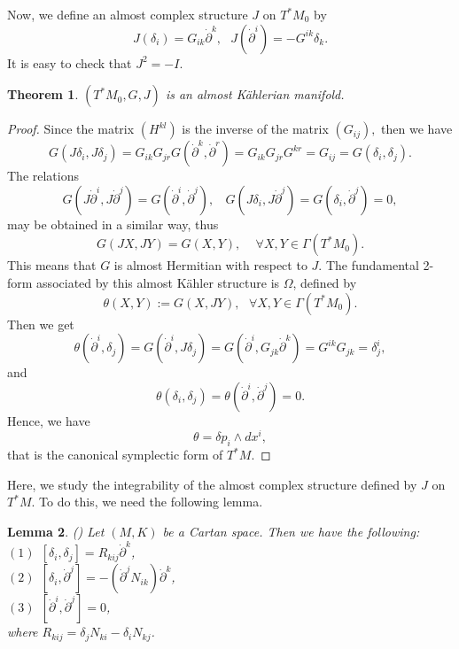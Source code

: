 \documentclass[10pt,a4paper]{article}
\theoremstyle{plain}
\newtheorem{theorem}{Theorem}[section]
\newtheorem{lemma}[theorem]{Lemma}
\theoremstyle{definition}
\begin{document}
Now, we define an almost complex structure  $J$  on  $T^{\ast}M_0$
by
\begin{equation}
J(\delta _{i})=G_{ik}\dot{\partial}^k,\ \ \
J(\dot{\partial}^i)=-G^{ik}\delta _k.
\end{equation}
It is easy to check that $J^2=-I$.
\begin{theorem}
 $(T^{\ast}M_0,G,J)$ is an almost K\"{a}hlerian manifold.
\end{theorem}
\begin{proof} Since the matrix $(H^{kl} )$ is the inverse of the
matrix $(G_{ij} ),$ then we have
\[
G(J\delta_i,J\delta_j)=G_{ik}G_{jr}G(\dot{\partial}^k,\dot{\partial}^r)=G_{ik}G_{jr}G^{kr}=G_{ij}=G(\delta_i,\delta_j).
\]
The relations
\[
G(J\dot{\partial}^i,J\dot{\partial}^j)=G(\dot{\partial}^i,\dot{\partial}^j),\
\ \ \ G(J\delta _i,J\dot{\partial}^j)=G(\delta
_i,\dot{\partial}^j)=0,
\]
may be obtained in a similar way, thus
\[
G(JX,JY)=G(X,Y),\, \, \, \, \, \, \, \forall X,Y\in
\Gamma(T^{\ast}M_0).
\]
This means that $G$ is almost Hermitian with respect to $J$. The
fundamental 2-form associated by this almost K\"{a}hler structure is
$\Omega$, defined by
\[
\theta(X,Y):=G(X,JY),\, \, \, \, \forall X,Y\in \Gamma
(T^{\ast}M_0).
\]
Then we get
\[
\theta(\dot{\partial}^i,\delta_j)=G(\dot{\partial}^i,J\delta_j)=G(\dot{\partial}^i,G_{jk}\dot{\partial}^k)=G^{ik}G_{jk}=\delta^i_j,
\]
 and
\[
\theta(\delta_i,\delta_j)=\theta(\dot{\partial}^i,\dot{\partial}^j)=0.
\]
Hence, we have
\begin{equation}
\theta=\delta p_i\wedge dx^i,
\end{equation}
that is the canonical symplectic form of $T^{\ast}M$.
\end{proof}

Here, we study the integrability of the almost complex structure
defined by $J$ on $T^{\ast}M$. To do this, we need the following lemma.

\begin{lemma}\rm{(\cite{MirHri}\cite{PT})}
Let $(M,K)$ be a Cartan space.  Then we have the following:\\
$(1)\ \ [\delta_i,\delta_j]=R_{kij}{\dot{\partial}}^k$,\\
$(2)\ \ [\delta_i,{\dot{\partial}}^j]=-({\dot{\partial}}^jN_{ik}){\dot{\partial}}^k$,\\
$(3)\ \ [{\dot{\partial}}^i,{\dot{\partial}}^j]=0$,\\
where $R_{kij}=\delta_jN_{ki}-\delta_iN_{kj}$.
\end{lemma}
\end{document}
